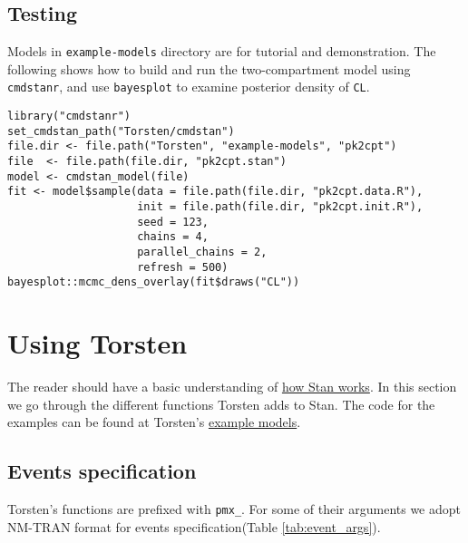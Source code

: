 \documentclass[12pt, reqno, oneside]{amsbook}
\numberwithin{equation}{chapter}
\numberwithin{figure}{chapter}
\numberwithin{table}{chapter}
\theoremstyle{remark}
\begin{document}
\section{Testing}
\label{sec:orgd7a34d7}
Models in \texttt{example-models} directory are for tutorial and demonstration.
The following shows how to build and run the two-compartment model
using \texttt{cmdstanr}, and use \texttt{bayesplot} to examine posterior density of \texttt{CL}.
\begin{verbatim}
library("cmdstanr")
set_cmdstan_path("Torsten/cmdstan")
file.dir <- file.path("Torsten", "example-models", "pk2cpt")
file  <- file.path(file.dir, "pk2cpt.stan")
model <- cmdstan_model(file)
fit <- model$sample(data = file.path(file.dir, "pk2cpt.data.R"),
                    init = file.path(file.dir, "pk2cpt.init.R"),
                    seed = 123,
                    chains = 4,
                    parallel_chains = 2,
                    refresh = 500)
bayesplot::mcmc_dens_overlay(fit$draws("CL"))
\end{verbatim}

\chapter{Using Torsten}
\label{using-torsten}
The reader should have a basic understanding of \href{https://mc-stan.org/users/documentation/}{how Stan works}.
In this section we go through the different functions Torsten adds to
Stan. The code for the examples can be found at Torsten's \href{https://github.com/metrumresearchgroup/Torsten/tree/master/example-models}{example models}.

\section{Events specification}
\label{sec:org02ca7f5}
Torsten's functions are prefixed with \texttt{pmx\_}.
For some of their arguments we adopt NM-TRAN format for events
specification(Table \ref{tab:event_args}).
\end{document}
